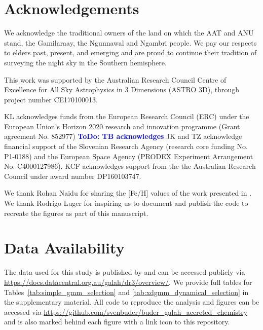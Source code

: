 \documentclass[fleqn,usenatbib]{mnras}
\newcommand{\ToDo}[1]{\textbf{\textcolor{blue}{ToDo: #1}}}
\begin{document}
\section*{Acknowledgements}

We acknowledge the traditional owners of the land on which the AAT and ANU stand, the Gamilaraay, the Ngunnawal and Ngambri people. We pay our respects to elders past, present, and emerging and are proud to continue their tradition of surveying the night sky in the Southern hemisphere.

This work was supported by the Australian Research Council Centre of Excellence for All Sky Astrophysics in 3 Dimensions (ASTRO 3D), through project number CE170100013.

KL acknowledges funds from the European Research Council (ERC) under the European Union's Horizon 2020 research and innovation programme (Grant agreement No. 852977)
\ToDo{TB acknowledges}
JK and TZ acknowledge financial support of the Slovenian Research Agency (research core funding No. P1-0188) and the European Space Agency (PRODEX Experiment Arrangement No. C4000127986).
KCF acknowledges support from the the Australian Research Council under award number DP160103747.

We thank Rohan Naidu for sharing the [Fe/H] values of the work presented in \citet{Naidu2020}. We thank Rodrigo Luger for inspiring us to document and publish the code to recreate the figures as part of this manuscript.

\section*{Data Availability}

The data used for this study is published by \citet{Buder2021} and can be accessed publicly via \url{https://docs.datacentral.org.au/galah/dr3/overview/}.
We provide full tables for Tables~\ref{tab:simple_gmm_selection} and \ref{tab:xdgmm_dynamical_selection} in the supplementary material. All code to reproduce the analysis and figures can be accessed via \url{https://github.com/svenbuder/buder_galah_accreted_chemistry} and is also marked behind each figure with a link icon to this repository.
\end{document}
